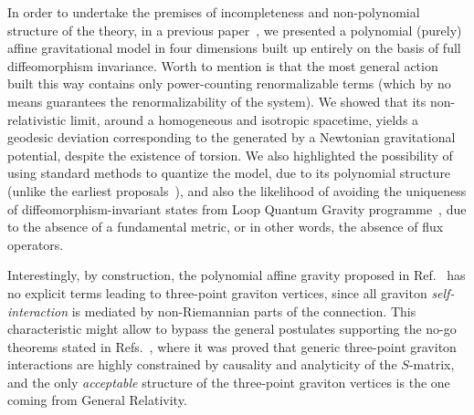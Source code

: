 \documentclass[aps,prd,12pt,twocolumn,superscriptaddress,showpacs,showkeys,reprint%
]{revtex4-1}
\renewcommand{\(}{\left(}
\renewcommand{\)}{\right)}
\renewcommand{\[}{\left[}
\renewcommand{\]}{\right]}
\begin{document}
In order to undertake the premises of incompleteness and non-polynomial structure of the theory, in a previous paper~\cite{Skirzewski:2014eta}, we presented a polynomial (purely) affine gravitational model in four dimensions built up entirely on the basis of full diffeomorphism invariance. Worth to mention is that the most general action built this way contains only power-counting renormalizable terms (which by no means guarantees the renormalizability of the system). We showed that its non-relativistic limit, around a homogeneous and isotropic spacetime, yields a geodesic deviation corresponding to the generated by a Newtonian gravitational potential, despite the existence of torsion. We also highlighted the possibility of using standard methods to quantize the model, due to its polynomial structure (unlike the earliest proposals~\cite{Eddington1923math,schrodinger1950space}), and also the likelihood of avoiding the uniqueness of diffeomorphism-invariant states from Loop Quantum Gravity programme~\cite{Lewandowski:2005jk}, due to the absence of a fundamental metric, or in other words, the absence of flux operators.

Interestingly, by construction, the polynomial affine gravity proposed in Ref.~\cite{Skirzewski:2014eta} has no explicit terms leading to three-point graviton vertices, since all graviton \emph{self-interaction} is mediated by non-Riemannian parts of the connection. This characteristic might allow to bypass the general postulates supporting the no-go theorems stated in Refs.~\cite{McGady:2013sga,Camanho:2014apa}, where it was proved that generic three-point graviton interactions are highly constrained by causality and analyticity of the $S$-matrix, and the only \emph{acceptable} structure of the three-point graviton vertices is the one coming from General Relativity.
\end{document}
